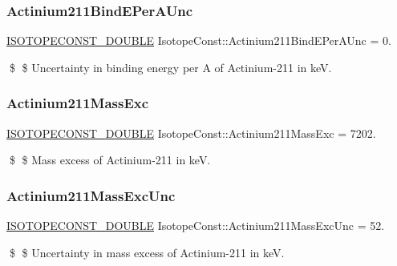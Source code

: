 \subsubsection{\texorpdfstring{Actinium211\+Bind\+E\+Per\+A\+Unc}{Actinium211BindEPerAUnc}}
{\footnotesize\ttfamily \mbox{\hyperlink{group___isotope_const-_macros_ga8f45a7272ce02c0b4c65c44636ed719a}{I\+S\+O\+T\+O\+P\+E\+C\+O\+N\+S\+T\+\_\+\+D\+O\+U\+B\+LE}} Isotope\+Const\+::\+Actinium211\+Bind\+E\+Per\+A\+Unc = 0.}

\$ \$ Uncertainty in binding energy per A of Actinium-\/211 in keV. \mbox{\label{group___isotope_const-_actinium-_ac211_ga455853a90ed766a7334312c4232b043b}} 
\subsubsection{\texorpdfstring{Actinium211\+Mass\+Exc}{Actinium211MassExc}}
{\footnotesize\ttfamily \mbox{\hyperlink{group___isotope_const-_macros_ga8f45a7272ce02c0b4c65c44636ed719a}{I\+S\+O\+T\+O\+P\+E\+C\+O\+N\+S\+T\+\_\+\+D\+O\+U\+B\+LE}} Isotope\+Const\+::\+Actinium211\+Mass\+Exc = 7202.}

\$ \$ Mass excess of Actinium-\/211 in keV. \mbox{\label{group___isotope_const-_actinium-_ac211_ga8dce62008756bbb664a58751513730d4}} 
\subsubsection{\texorpdfstring{Actinium211\+Mass\+Exc\+Unc}{Actinium211MassExcUnc}}
{\footnotesize\ttfamily \mbox{\hyperlink{group___isotope_const-_macros_ga8f45a7272ce02c0b4c65c44636ed719a}{I\+S\+O\+T\+O\+P\+E\+C\+O\+N\+S\+T\+\_\+\+D\+O\+U\+B\+LE}} Isotope\+Const\+::\+Actinium211\+Mass\+Exc\+Unc = 52.}

\$ \$ Uncertainty in mass excess of Actinium-\/211 in keV. \mbox{\label{group___isotope_const-_actinium-_ac211_ga61dfe19df2cd87b64e455d8229a1cc10}} 

